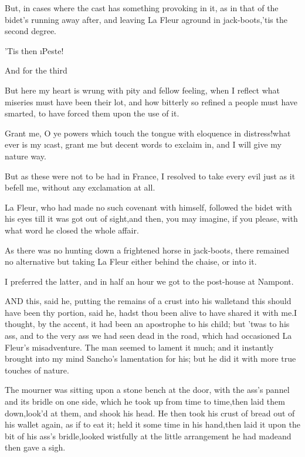 \documentclass[twoside]{article}
\begin{document}
But, in cases where the cast has something provoking in it, as in that of
the bidet’s running away after, and leaving La Fleur aground in
jack-boots,\tsk ’tis the second degree.

’Tis then \i{Peste}!

And for the third\tsk 

\tsk But here my heart is wrung with pity and fellow feeling, when I reflect
what miseries must have been their lot, and how bitterly so refined a
people must have smarted, to have forced them upon the use of it.\tsk 

Grant me, O ye powers which touch the tongue with eloquence in
distress!\tsk what ever is my \i{cast}, grant me but decent words to exclaim
in, and I will give my nature way.

\tsk But as these were not to be had in France, I resolved to take every evil
just as it befell me, without any exclamation at all.

La Fleur, who had made no such covenant with himself, followed the bidet
with his eyes till it was got out of sight,\tsk and then, you may imagine, if
you please, with what word he closed the whole affair.

As there was no hunting down a frightened horse in jack-boots, there
remained no alternative but taking La Fleur either behind the chaise, or
into it.\tsk 

I preferred the latter, and in half an hour we got to the post-house at
Nampont.






\tsk AND this, said he, putting the remains of a crust into his wallet\tsk and
this should have been thy portion, said he, hadst thou been alive to have
shared it with me.\tsk I thought, by the accent, it had been an apostrophe to
his child; but ’twas to his ass, and to the very ass we had seen dead in
the road, which had occasioned La Fleur’s misadventure.  The man seemed
to lament it much; and it instantly brought into my mind Sancho’s
lamentation for his; but he did it with more true touches of nature.

The mourner was sitting upon a stone bench at the door, with the ass’s
pannel and its bridle on one side, which he took up from time to
time,\tsk then laid them down,\tsk look’d at them, and shook his head.  He then
took his crust of bread out of his wallet again, as if to eat it; held it
some time in his hand,\tsk then laid it upon the bit of his ass’s
bridle,\tsk looked wistfully at the little arrangement he had made\tsk and then
gave a sigh.
\end{document}
